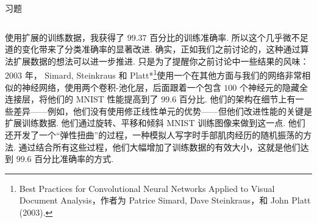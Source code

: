 \begin{exerciseBox}{习题}
\begin{lstlisting}
\end{lstlisting}

使用扩展的训练数据，我获得了 $99.37$ 百分比的训练准确率. 所以这个几乎微不足道的变化带来了分类准确率的显著改进. 确实，正如我们之前讨论的，这种通过算法扩展数据的想法可以进一步推进. 只是为了提醒你之前讨论中一些结果的风味： 2003 年， Simard, Steinkraus 和 Platt*\footnote{Best Practices for Convolutional Neural Networks Applied to Visual Document Analysis，作者为 Patrice Simard, Dave Steinkraus，和 John Platt (2003).}使用一个在其他方面与我们的网络非常相似的神经网络，使用两个卷积-池化层，后面跟着一个包含 $100$ 个神经元的隐藏全连接层，将他们的 MNIST 性能提高到了 $99.6$ 百分比. 他们的架构在细节上有一些差异——例如，他们没有使用修正线性单元的优势——但他们改进性能的关键是扩展训练数据. 他们通过旋转、平移和倾斜 MNIST 训练图像来做到这一点. 他们还开发了一个``弹性扭曲''的过程，一种模拟人写字时手部肌肉经历的随机振荡的方法. 通过结合所有这些过程，他们大幅增加了训练数据的有效大小，这就是他们达到 $99.6$ 百分比准确率的方式.

\end{exerciseBox}
